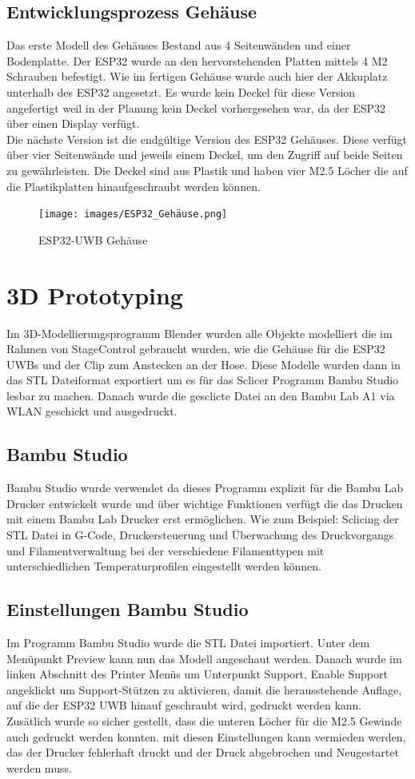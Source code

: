 \subsection{Entwicklungsprozess Gehäuse}
Das erste Modell des Gehäuses Bestand aus 4 Seitenwänden und einer Bodenplatte. Der ESP32 wurde an den hervorstehenden Platten mittels 4 M2 Schrauben befestigt. Wie im fertigen Gehäuse wurde auch hier der Akkuplatz unterhalb des ESP32 angesetzt. Es wurde kein Deckel für diese Version angefertigt weil in der Planung kein Deckel vorhergesehen war, da der ESP32 über einen Display verfügt. \\
Die nächste Version ist die endgültige Version des ESP32 Gehäuses. Diese verfügt über vier Seitenwände und jeweils einem Deckel, um den Zugriff auf beide Seiten zu gewährleisten. Die Deckel sind aus Plastik und haben vier M2.5 Löcher die auf die Plastikplatten hinaufgeschraubt werden können.

\begin{figure}[H]
	\centering
	\texttt{[image: images/ESP32\_Gehäuse.png]}
	\caption[ESP32-UWB Gehäuse]{ESP32-UWB Gehäuse}
	\label{fig:ESP32-UWB Gehäuse}
\end{figure}


\section{3D Prototyping}
Im 3D-Modellierungsprogramm Blender wurden alle Objekte modelliert die im Rahmen von StageControl gebraucht wurden, wie die Gehäuse für die ESP32 UWBs und der Clip zum Anstecken an der Hose. Diese Modelle wurden dann in das STL Dateiformat exportiert um es für das Sclicer Programm Bambu Studio lesbar zu machen. Danach wurde die gesclicte Datei an den Bambu Lab A1 via WLAN geschickt und ausgedruckt.

\subsection{Bambu Studio}
Bambu Studio wurde verwendet da dieses Programm explizit für die Bambu Lab Drucker entwickelt wurde und über wichtige Funktionen verfügt die das Drucken mit einem Bambu Lab Drucker erst ermöglichen. Wie zum Beispiel: Sclicing der STL Datei in G-Code, Druckersteuerung und Überwachung des Druckvorgangs und Filamentverwaltung bei der verschiedene Filamenttypen mit unterschiedlichen Temperaturprofilen eingestellt werden können.


\subsection{Einstellungen Bambu Studio}
Im Programm Bambu Studio wurde die STL Datei importiert. Unter dem Menüpunkt Preview kann nun das Modell angeschaut werden. Danach wurde im linken Abschnitt des Printer Menüs um Unterpunkt Support, Enable Support angeklickt um Support-Stützen zu aktivieren, damit die herausstehende Auflage, auf die der ESP32 UWB hinauf geschraubt wird, gedruckt werden kann. Zusätlich wurde so sicher gestellt, dass die unteren Löcher für die M2.5 Gewinde auch gedruckt werden konnten. mit diesen Einstellungen kann vermieden werden, das der Drucker fehlerhaft druckt und der Druck abgebrochen und Neugestartet werden muss.

